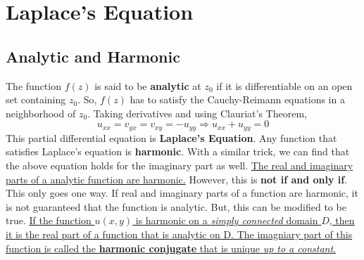 \documentclass[../main.tex]{subfiles}
\begin{document}
\chapter{Laplace's Equation}
\section{Analytic and Harmonic}
    The function $f(z)$ is said to be \textbf{analytic} at $z_{0}$ if it is differentiable on an open set containing $z_{0}$.
    So, $f(z)$ has to satisfy the Cauchy-Reimann equations in a neighborhood of $z_{0}$. Taking derivatives and using Clauriat's Theorem,
    $$u_{xx}=v_{yx}=v_{xy}=-u_{yy}\Rightarrow u_{xx}+u_{yy}=0$$
    This partial differential equation is \textbf{Laplace's Equation}. Any function that satisfies Laplace's equation is \textbf{harmonic}. 
    With a similar trick, we can find that the above equation holds for the imaginary part as well.
    \ul{The real and imaginary parts of a analytic function are harmonic.}
    However, this is \textbf{not if and only if}. This only goes one way. If real and imaginary parts of a function are harmonic, it is not 
    guaranteed that the function is analytic. But, this can be modified to be true.
    \ul{If the function $u(x,y)$ is harmonic on a \textit{simply connected} domain $D$,
    then it is the real part of a function that is analytic on D. The imagniary part of this function is called the \textbf{harmonic conjugate}
    that is unique \textit{up to a constant}.}
\end{document}
